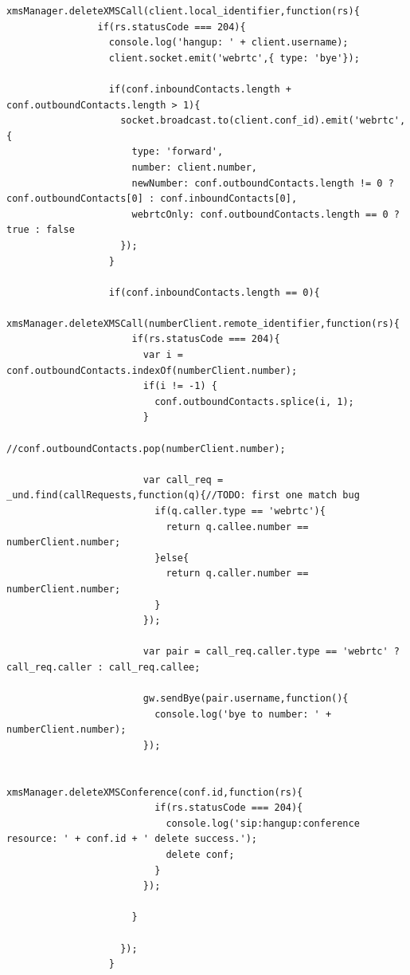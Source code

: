 \begin{appendices}
\begin{lstlisting}[caption={socket.js on Application Server},label={code:server_socket}]
              xmsManager.deleteXMSCall(client.local_identifier,function(rs){
                if(rs.statusCode === 204){
                  console.log('hangup: ' + client.username);
                  client.socket.emit('webrtc',{ type: 'bye'});

                  if(conf.inboundContacts.length + conf.outboundContacts.length > 1){
                    socket.broadcast.to(client.conf_id).emit('webrtc',{
                      type: 'forward',
                      number: client.number,
                      newNumber: conf.outboundContacts.length != 0 ? conf.outboundContacts[0] : conf.inboundContacts[0],
                      webrtcOnly: conf.outboundContacts.length == 0 ? true : false
                    });
                  }

                  if(conf.inboundContacts.length == 0){
                    xmsManager.deleteXMSCall(numberClient.remote_identifier,function(rs){
                      if(rs.statusCode === 204){
                        var i = conf.outboundContacts.indexOf(numberClient.number);
                        if(i != -1) {
                          conf.outboundContacts.splice(i, 1);
                        }
                        //conf.outboundContacts.pop(numberClient.number);

                        var call_req = _und.find(callRequests,function(q){//TODO: first one match bug
                          if(q.caller.type == 'webrtc'){
                            return q.callee.number == numberClient.number;
                          }else{
                            return q.caller.number == numberClient.number;
                          }
                        });

                        var pair = call_req.caller.type == 'webrtc' ? call_req.caller : call_req.callee;

                        gw.sendBye(pair.username,function(){
                          console.log('bye to number: ' + numberClient.number);
                        });

                        xmsManager.deleteXMSConference(conf.id,function(rs){
                          if(rs.statusCode === 204){
                            console.log('sip:hangup:conference resource: ' + conf.id + ' delete success.');
                            delete conf;
                          }
                        });

                      }
                      
                    });
                  }


\end{lstlisting}
\end{appendices}
